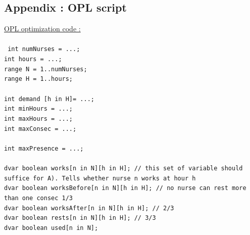 \documentclass[11pt]{article}
\begin{document}
{\begin{appendix}
\section{Appendix  : OPL script }
\label{appenOPL}
\underline{OPL optimization code :}\\\\
{\tt
int numNurses = ...;\\
int hours = ...;\\
range N = 1..numNurses;\\
range H = 1..hours;\\
\\
int demand [h in H]= ...;\\
int minHours = ...;\\
int maxHours = ...;\\
int maxConsec = ...;\\
\\
int maxPresence = ...;\\
\\
dvar boolean works[n in N][h in H]; // this set of variable should suffice for A). Tells whether nurse n works at hour h\\
dvar boolean worksBefore[n in N][h in H]; // no nurse can rest more than one consec 1/3\\
dvar boolean worksAfter[n in N][h in H]; // 2/3\\
dvar boolean rests[n in N][h in H]; // 3/3\\
dvar boolean used[n in N];\\
\\\\

}
\end{appendix}}
\end{document}
